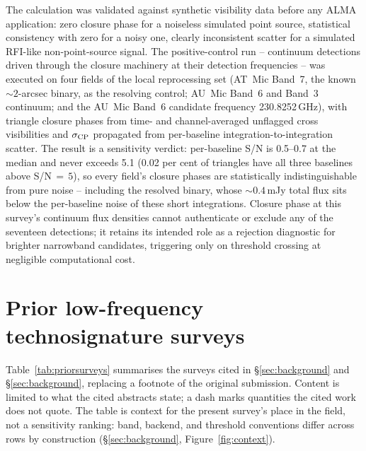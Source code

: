 \documentclass{openjournal}
\begin{document}
The calculation was validated against synthetic visibility data
before any ALMA application: zero closure phase for a noiseless
simulated point source, statistical consistency with zero for a noisy
one, clearly inconsistent scatter for a simulated RFI-like
non-point-source signal. The positive-control run -- continuum
detections driven through the closure machinery at their detection
frequencies -- was executed on four fields of the local reprocessing
set (AT~Mic Band~7, the known ${\sim}2$-arcsec binary, as the
resolving control; AU~Mic Band~6 and Band~3 continuum; and the AU~Mic
Band~6 candidate frequency 230.8252\,GHz), with triangle closure
phases from time- and channel-averaged unflagged cross visibilities
and $\sigma_{\rm CP}$ propagated from per-baseline
integration-to-integration scatter. The result is a sensitivity
verdict: per-baseline S/N is 0.5--0.7 at the median and never exceeds
5.1 (0.02 per cent of triangles have all three baselines above
S/N$\,{=}\,5$), so every field's closure phases are statistically
indistinguishable from pure noise -- including the resolved binary,
whose ${\sim}0.4$\,mJy total flux sits below the per-baseline noise of
these short integrations. Closure phase at this survey's continuum
flux densities cannot authenticate or exclude any of the seventeen
detections; it retains its intended role as a rejection diagnostic for
brighter narrowband candidates, triggering only on threshold crossing
at negligible computational cost.
\section{Prior low-frequency technosignature surveys}
\label{app:priorsurveys}

Table~\ref{tab:priorsurveys} summarises the surveys cited in
\S\ref{sec:background} and \S\ref{sec:background}, replacing a footnote of the
original submission. Content is limited to what the cited abstracts
state; a dash marks quantities the cited work does not quote. The
table is context for the present survey's place in the field, not a
sensitivity ranking: band, backend, and threshold conventions differ
across rows by construction (\S\ref{sec:background},
Figure~\ref{fig:context}).
\end{document}
